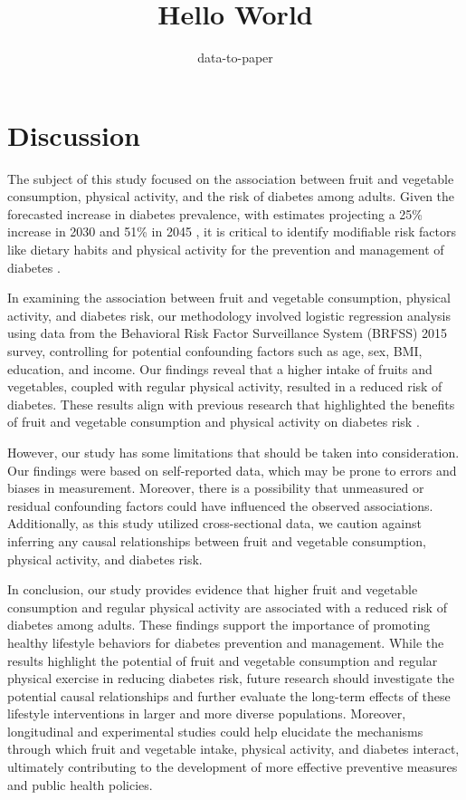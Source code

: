 \documentclass[12pt]{article}
\title{Hello World}
\author{data-to-paper}
\begin{document}
\maketitle

\section{Discussion}

The subject of this study focused on the association between fruit and vegetable consumption, physical activity, and the risk of diabetes among adults. Given the forecasted increase in diabetes prevalence, with estimates projecting a 25\% increase in 2030 and 51\% in 2045 \cite{Saeedi2019GlobalAR}, it is critical to identify modifiable risk factors like dietary habits and physical activity for the prevention and management of diabetes \cite{Uloko2018PrevalenceAR}. 

In examining the association between fruit and vegetable consumption, physical activity, and diabetes risk, our methodology involved logistic regression analysis using data from the Behavioral Risk Factor Surveillance System (BRFSS) 2015 survey, controlling for potential confounding factors such as age, sex, BMI, education, and income. Our findings reveal that a higher intake of fruits and vegetables, coupled with regular physical activity, resulted in a reduced risk of diabetes. These results align with previous research that highlighted the benefits of fruit and vegetable consumption and physical activity on diabetes risk \cite{Herbst2007ImpactOP, Carlström2018CoffeeCA, Drouin-Chartier2016SystematicRO}.

However, our study has some limitations that should be taken into consideration. Our findings were based on self-reported data, which may be prone to errors and biases in measurement. Moreover, there is a possibility that unmeasured or residual confounding factors could have influenced the observed associations. Additionally, as this study utilized cross-sectional data, we caution against inferring any causal relationships between fruit and vegetable consumption, physical activity, and diabetes risk. 

In conclusion, our study provides evidence that higher fruit and vegetable consumption and regular physical activity are associated with a reduced risk of diabetes among adults. These findings support the importance of promoting healthy lifestyle behaviors for diabetes prevention and management. While the results highlight the potential of fruit and vegetable consumption and regular physical exercise in reducing diabetes risk, future research should investigate the potential causal relationships and further evaluate the long-term effects of these lifestyle interventions in larger and more diverse populations. Moreover, longitudinal and experimental studies could help elucidate the mechanisms through which fruit and vegetable intake, physical activity, and diabetes interact, ultimately contributing to the development of more effective preventive measures and public health policies.
\end{document}
